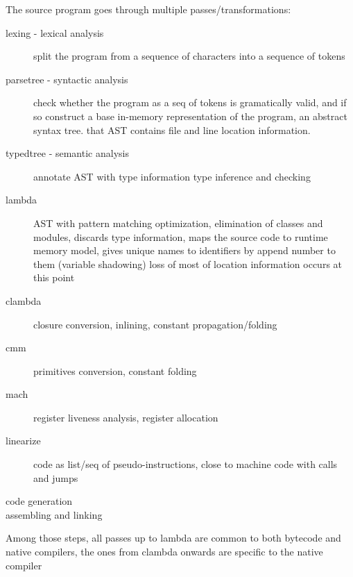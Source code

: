 The source program goes through multiple passes/transformations:

\begin{description}
    \item[lexing - lexical analysis]
        split the program from a sequence of characters into a sequence of tokens

    \item[parsetree - syntactic analysis]

        check whether the program as a seq of tokens is gramatically valid, and if so
        construct a base in-memory representation of the program, an abstract syntax
        tree. that AST contains file and line location information.

    \item[typedtree - semantic analysis]
        annotate AST with type information
        type inference and checking

    \item[lambda]
        AST with
        pattern matching optimization,
        elimination of classes and modules,
        discards type information,
        maps the source code to runtime memory model,
        gives unique names to identifiers by append number to them
        (variable shadowing)
        loss of most of location information occurs at this point

    \item[clambda]
        closure conversion, inlining, constant propagation/folding

    \item[cmm]
        primitives conversion, constant folding

    \item[mach]
        register liveness analysis, register allocation

    \item[linearize]
        code as list/seq of pseudo-instructions, close to machine code
        with calls and jumps

    \item[code generation]

    \item[assembling and linking]
\end{description}

Among those steps, all passes up to lambda are common to both bytecode and
native compilers, the ones from clambda onwards are specific to the native compiler

